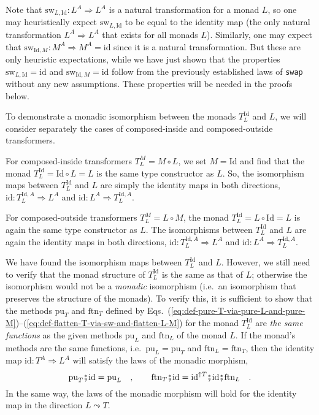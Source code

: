 Note that $\text{sw}_{L,\text{Id}}:L^{A}\Rightarrow L^{A}$ is a natural
transformation for a monad $L$, so one may heuristically expect $\text{sw}_{L,\text{Id}}$
to be equal to the identity map (the only natural transformation $L^{A}\Rightarrow L^{A}$
that exists for all monads $L$). Similarly, one may expect that $\text{sw}_{\text{Id},M}:M^{A}\Rightarrow M^{A}=\text{id}$
since it is a natural transformation. But these are only heuristic
expectations, while we have just shown that the properties $\text{sw}_{L,\text{Id}}=\text{id}$
and $\text{sw}_{\text{Id},M}=\text{id}$ follow from the previously
established laws of \lstinline!swap!
without any new assumptions. These properties will be needed in the
proofs below. 

To demonstrate a monadic isomorphism between the monads $T_{L}^{\text{Id}}$
and $L$, we will consider separately the cases of composed-inside
and composed-outside transformers.

For composed-inside transformers $T_{L}^{M}=M\circ L$, we set $M=\text{Id}$
and find that the monad $T_{L}^{\text{Id}}=\text{Id}\circ L=L$ is
the same type constructor as $L$. So, the isomorphism maps between
$T_{L}^{\text{Id}}$ and $L$ are simply the identity maps in both
directions, $\text{id}:T_{L}^{\text{Id},A}\Rightarrow L^{A}$ and
$\text{id}:L^{A}\Rightarrow T_{L}^{\text{Id},A}$. 

For composed-outside transformers $T_{L}^{M}=L\circ M$, the monad
$T_{L}^{\text{Id}}=L\circ\text{Id}=L$ is again the same type constructor
as $L$. The isomorphisms between $T_{L}^{\text{Id}}$ and $L$ are
again the identity maps in both directions, $\text{id}:T_{L}^{\text{Id},A}\Rightarrow L^{A}$
and $\text{id}:L^{A}\Rightarrow T_{L}^{\text{Id},A}$. 

We have found the isomorphism maps between $T_{L}^{\text{Id}}$ and
$L$. However, we still need to verify that the monad structure of
$T_{L}^{\text{Id}}$ is the same as that of $L$; otherwise the isomorphism
would not be a \emph{monadic} isomorphism (i.e.~an isomorphism that
preserves the structure of the monads). To verify this, it is sufficient
to show that the methods $\text{pu}_{T}$ and $\text{ftn}_{T}$ defined
by Eqs.~(\ref{eq:def-pure-T-via-pure-L-and-pure-M})–(\ref{eq:def-flatten-T-via-sw-and-flatten-L-M})
for the monad $T_{L}^{\text{Id}}$ are \emph{the same functions} as
the given methods $\text{pu}_{L}$ and $\text{ftn}_{L}$ of the monad
$L$. If the monad's methods are the same functions, i.e.~$\text{pu}_{L}=\text{pu}_{T}$
and $\text{ftn}_{L}=\text{ftn}_{T}$, then the identity map $\text{id}:T^{A}\Rightarrow L^{A}$
will satisfy the laws of the monadic morphism,
\[
\text{pu}_{T}\bef\text{id}=\text{pu}_{L}\quad,\quad\quad\text{ftn}_{T}\bef\text{id}=\text{id}^{\uparrow T}\bef\text{id}\bef\text{ftn}_{L}\quad.
\]
In the same way, the laws of the monadic morphism will hold for the
identity map in the direction $L\leadsto T$. 

